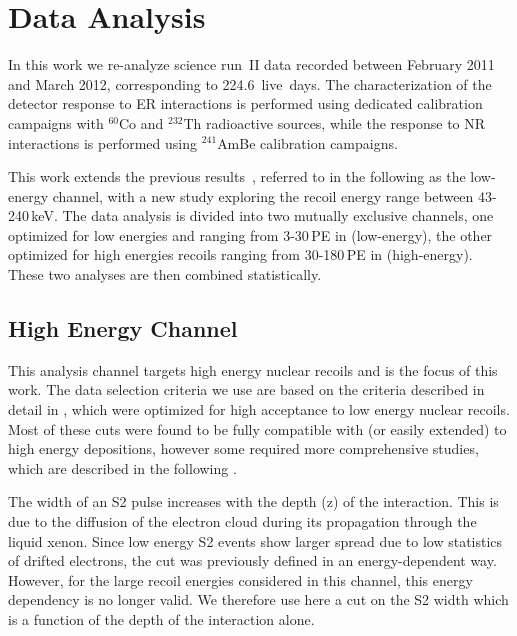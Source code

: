 \section{Data Analysis}
\label{sec:Analysis}
In this work we re-analyze science run~II data recorded between February 2011 and March 2012, 
corresponding to 224.6~live~days. The characterization of the detector response to ER interactions is performed using dedicated calibration campaigns with $^{60}$Co and $^{232}$Th radioactive sources, while the response to NR interactions is performed using $^{241}$AmBe calibration campaigns.

 
This work extends the previous results~\cite{xe100_run10_si,xe100_run_combination}, referred to in the following as the low-energy channel, with a new study exploring the recoil energy range between 43-240\,keV. 
The data analysis is divided into two mutually exclusive channels, one optimized for low energies and ranging from 3-30\,PE in \cSi (low-energy), 
the other optimized for high energies recoils ranging from 30-180\,PE in \cSi (high-energy). These two analyses are then combined statistically. 


\subsection{High Energy Channel}
\label{subsubsec:HighE}
This analysis channel targets high energy nuclear recoils and is the focus of this work. The data selection criteria we use are based on the criteria described in detail in \cite{Aprile:2012vw}, which were optimized for high 
acceptance to low energy nuclear recoils.
Most of these cuts were found to be fully compatible with (or easily extended) to high energy depositions, however some required more comprehensive studies, which are described in the following . 

The width of an S2 pulse increases with the depth (z) of the interaction. This is due to the diffusion of the electron cloud during its propagation
through the liquid xenon. Since low energy S2 events show larger spread
due to low statistics of drifted electrons, the cut was previously defined in an energy-dependent way. However, for the large recoil energies considered in this channel, this energy dependency is no longer valid. We therefore use here a cut on the S2 width which is a function of the depth of the interaction alone. 

